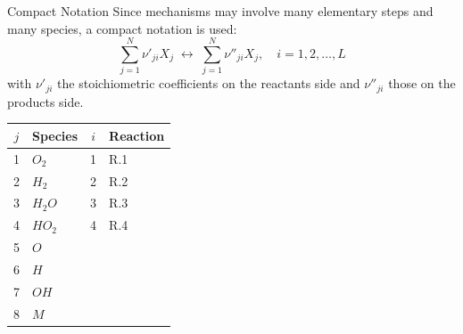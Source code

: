 \documentclass[10pt,aspectratio=43]{beamer}
\begin{document}
\begin{frame}{Compact Notation}
  Since mechanisms may involve many elementary steps and many species, a
  compact notation is used:
  \[
    \sum_{j=1}^{N}\!\nu'_{ji}X_{j} \;\longleftrightarrow\; \sum_{j=1}^{N}\!\nu''_{ji}X_{j}, \quad i=1,2,\dots,L
  \]
  with $\nu'_{ji}$ the stoichiometric coefficients on the reactants side
  and $\nu''_{ji}$ those on the products side.

  \begin{center}\footnotesize
  \begin{tabular}{cl@{\hskip 24pt}cl}
    \toprule
    $j$ & Species & $i$ & Reaction \\ \midrule
    1 & $O_{2}$  & 1 & R.1 \\
    2 & $H_{2}$  & 2 & R.2 \\
    3 & $H_{2}O$ & 3 & R.3 \\
    4 & $HO_{2}$ & 4 & R.4 \\
    5 & $O$      &   &     \\
    6 & $H$      &   &     \\
    7 & $OH$     &   &     \\
    8 & $M$      &   &     \\
    \bottomrule
  \end{tabular}
  \end{center}
\end{frame}
\end{document}
